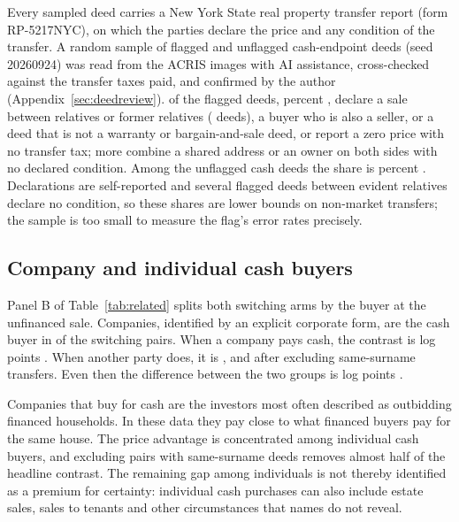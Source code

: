 \documentclass[12pt]{article}
\begin{document}
Every sampled deed carries a New York State real property transfer report (form RP-5217NYC), on which the parties declare the price and any condition of the transfer. A random sample of \DeedN{} flagged and \DeedUN{} unflagged cash-endpoint deeds (seed 20260924) was read from the ACRIS images with AI assistance, cross-checked against the transfer taxes paid, and confirmed by the author (Appendix~\ref{sec:deedreview}). \DeedYes{} of the \DeedN{} flagged deeds, \DeedShare{} percent \DeedCI{}, declare a sale between relatives or former relatives (\DeedBoxA{} deeds), a buyer who is also a seller, or a deed that is not a warranty or bargain-and-sale deed, or report a zero price with no transfer tax; \DeedPossible{} more combine a shared address or an owner on both sides with no declared condition. Among the unflagged cash deeds the share is \DeedUShare{} percent \DeedUCI{}. Declarations are self-reported and several flagged deeds between evident relatives declare no condition, so these shares are lower bounds on non-market transfers; the sample is too small to measure the flag's error rates precisely.


\subsection{Company and individual cash buyers}
Panel B of Table~\ref{tab:related} splits both switching arms by the buyer at the unfinanced sale. Companies, identified by an explicit corporate form, are the cash buyer in \CashCompanyPairs{} of the \SwitchPairs{} switching pairs. When a company pays cash, the contrast is \CompanyCash{} log points \CompanyCashCI{}. When another party does, it is \OtherCash{} \OtherCashCI{}, and \OtherCashNoRel{} \OtherCashNoRelCI{} after excluding same-surname transfers. Even then the difference between the two groups is \OtherMinusCompanyNoRel{} log points \OtherMinusCompanyNoRelCI{}.

Companies that buy for cash are the investors most often described as outbidding financed households. In these data they pay close to what financed buyers pay for the same house. The price advantage is concentrated among individual cash buyers, and excluding pairs with same-surname deeds removes almost half of the headline contrast. The remaining gap among individuals is not thereby identified as a premium for certainty: individual cash purchases can also include estate sales, sales to tenants and other circumstances that names do not reveal. 
\end{document}

